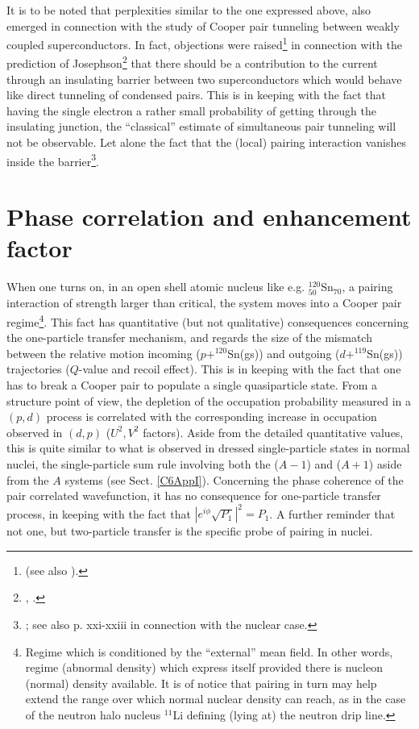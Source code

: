 It is to be noted that  perplexities similar to the one expressed above,  also emerged in connection with the study  of Cooper pair tunneling between weakly coupled superconductors. In fact, objections were raised\footnote{\cite{Bardeen:62,Bardeen:61} (see also \cite{Pippard:12,Cohen:62,McDonald:01}).}   in connection with the prediction of Josephson\footnote{\cite{Josephson:62}, \cite{Anderson:64b}.} that there should be a contribution to the current through an insulating barrier between two superconductors which would behave like direct tunneling of condensed pairs. This is in keeping with the fact that having the single electron a rather small probability of getting through the insulating junction,  the ``classical'' estimate of simultaneous pair tunneling will not be observable. Let alone the fact that the (local) pairing interaction vanishes inside the barrier\footnote{\cite{Anderson:70};  see also \cite{Broglia:19d} p. xxi-xxiii in connection with the nuclear case.}.


\section{Phase correlation and enhancement factor}\label{S4.3}
When one turns on, in an open shell atomic nucleus like e.g. $^{120}_{50}$Sn$_{70}$, a pairing interaction of strength larger than critical, the system moves into a Cooper pair regime\footnote{Regime which is conditioned by the ``external'' mean field. In other words, regime (abnormal density) which express itself provided there is nucleon (normal) density available. It is of notice that pairing in turn may help extend the range over which normal nuclear density can reach, as in the case of the neutron halo nucleus $^{11}$Li  defining (lying at) the neutron drip line.}. This fact has quantitative (but not qualitative)  consequences concerning the one-particle transfer mechanism,  and regards the size of the mismatch between the relative motion incoming ($p+^{120}$Sn(gs)) and outgoing ($d+^{119}$Sn(gs)) trajectories ($Q$-value and recoil effect). This is in keeping with the fact that one has to break a Cooper pair to populate a single  quasiparticle state. From a structure point of view, the depletion of the occupation probability measured in a $(p,d)$ process is correlated with the corresponding increase in occupation observed in $(d,p)$ ($U^2,V^2$ factors). Aside  from the detailed quantitative values, this is quite similar to what is observed in dressed single-particle states in normal nuclei, the single-particle sum rule involving both the ($A-1$) and ($A+1$) aside from the $A$ systems (see Sect. \ref{C6AppI}). Concerning the phase coherence of the pair correlated wavefunction, it has no consequence for one-particle transfer process, in keeping with the fact that $|e^{i\phi}\sqrt{P_1}|^2=P_1$. A further reminder  that not one, but two-particle transfer is the specific probe of pairing in nuclei.




